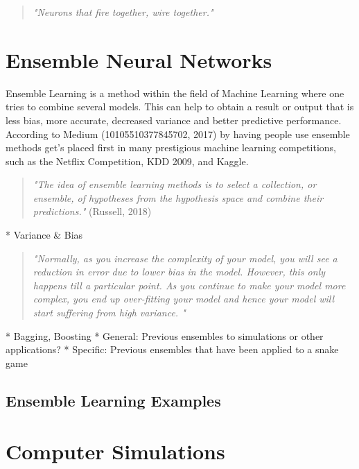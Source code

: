 \documentclass[
a4paper,
11pt,
english
]{report}
\begin{document}
\begin{quote}
    \textit{"Neurons that fire together, wire together."}
\end{quote}


\clearpage


\section{Ensemble Neural Networks}
Ensemble Learning is a method within the field of Machine Learning where one tries to combine several models. This can help to obtain a result or output that is less bias, more accurate, decreased variance and better predictive performance. According to Medium (10105510377845702, 2017) by having people use ensemble methods get's placed first in many prestigious machine learning competitions, such as the Netflix Competition, KDD 2009, and Kaggle.

\begin{quote}
    \textit{"The idea of ensemble learning methods is to select a collection, or ensemble, of hypotheses from the hypothesis space and combine their predictions."} (Russell, 2018)
\end{quote}

* Variance \& Bias
\begin{quote}
    \textit{"Normally, as you increase the complexity of your model, you will see a reduction in error due to lower bias in the model. However, this only happens till a particular point. As you continue to make your model more complex, you end up over-fitting your model and hence your model will start suffering from high variance. "}
\end{quote}
    
    * Bagging, Boosting
* General: Previous ensembles to simulations or other applications?
* Specific: Previous ensembles that have been applied to a snake game

\subsection{Ensemble Learning Examples}


\section{Computer Simulations}
\end{document}
